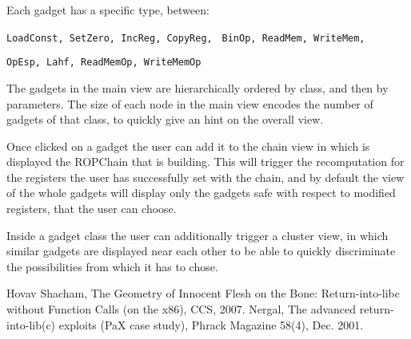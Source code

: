 \documentclass[twocolumn, 11pt]{article}
\begin{document}
\bigskip
Each gadget has a specific type, between:

\bigskip\noindent
\texttt{LoadConst, SetZero, IncReg, CopyReg, }
\noindent\texttt{BinOp, ReadMem, WriteMem,}

\noindent\texttt{OpEsp, Lahf, ReadMemOp, WriteMemOp}

\bigskip
The gadgets in the main view are hierarchically ordered by class, and then by parameters. The size of each node in the main view encodes the number of gadgets of that class, to quickly give an hint on the overall view.

\bigskip
Once clicked on a gadget the user can add it to the chain view in which is displayed the ROPChain that is building. This will trigger the recomputation for the registers the user has successfully set with the chain, and by default the view of the whole gadgets will display only the gadgets safe with respect to modified registers, that the user can choose.

Inside a gadget class the user can additionally trigger a cluster view, in which similar gadgets are displayed near each other to be able to quickly discriminate the possibilities from which it has to chose.





\begin{thebibliography}{99}
    Hovav Shacham,
    The Geometry of Innocent Flesh on the Bone: Return-into-libc without Function Calls (on the x86),
    CCS,
    2007.
    Nergal,
    The advanced return-into-lib(c) exploits (PaX case study),
    Phrack Magazine 58(4),
    Dec. 2001.

\end{thebibliography}
\end{document}
